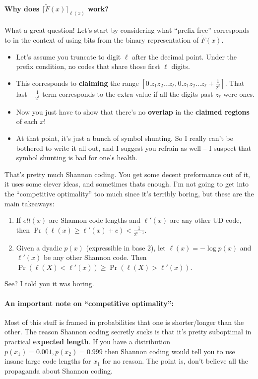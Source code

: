 \documentclass[a4paper,12pt]{report}
\begin{document}
\paragraph{Why does $\lceil \tilde F(x) \rceil_{\ell(x)}$ work? } What a great
question! Let's start by considering what ``prefix-free'' corresponds to in the
context of using bits from the binary representation of $\tilde F(x)$. 
\begin{itemize}
\item Let's assume you truncate to digit $\ell$ after the decimal point. Under
the prefix condition, no codes that share those first $\ell$ digits. 
\item This corresponds to \textbf{claiming} the range $[0.z_1z_2\dots z_\ell,
0.z_1z_2\dots z_\ell + \frac 1 {2^\ell}]$. That last $+\frac 1 {2^\ell}$ term
corresponds to the extra value if all the digits past $z_\ell$ were ones. 
\item Now you just have to show that there's no \textbf{overlap} in the
\textbf{claimed regions} of each $x$!
\item At that point, it's just a bunch of symbol shunting. So I really can't be
bothered to write it all out, and I suggest you refrain as well -- I suspect
that symbol shunting is bad for one's health.
\end{itemize}


That's pretty much Shannon coding. You get some decent preformance out of it,
it uses some clever ideas, and sometimes thats enough. I'm not going to get into
the ``competitive optimality'' too much since it's terribly boring, but these
are the main takeaways:
\begin{enumerate}
\item If $ell(x)$ are Shannon code lengths and $\ell'(x)$ are any other UD code,
then $\Pr(\ell(x) \geq \ell'(x) + c) < \frac 1 {2^{c-1}}$.
\item Given a dyadic $p(x)$ (expressible in base 2), let $\ell(x) = -\log p(x)$
and $\ell'(x)$ be any other Shannon code. Then $\Pr (\ell(X) < \ell'(x)) \geq
\Pr(\ell(X) > \ell'(x))$. 
\end{enumerate}
See? I told you it was boring. 



\paragraph{An important note on ``competitive optimality'': } Most of this stuff
is framed in probabilities that one is shorter/longer than the other. The reason
Shannon coding secretly sucks is that it's pretty suboptimal in practical
\textbf{expected length}. If you have a distribution $p(x_1) = 0.001, p(x_2) =
0.999$ then Shannon coding would tell you to use insane large code lengths for
$x_1$ for no reason. The point is, don't believe all the propaganda about
Shannon coding. 
\end{document}
